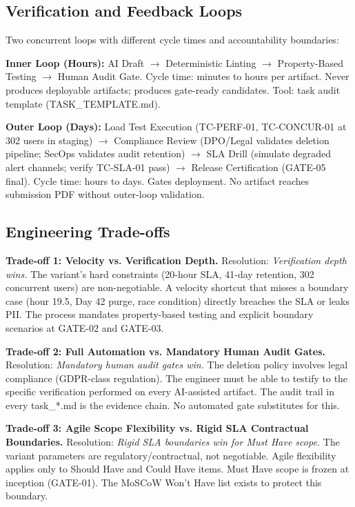 \documentclass[10pt,a4paper]{article}
\begin{document}
\subsection{Verification and Feedback Loops}

Two concurrent loops with different cycle times and accountability boundaries:

\textbf{Inner Loop (Hours):} AI Draft $\rightarrow$ Deterministic Linting $\rightarrow$ Property-Based Testing $\rightarrow$ Human Audit Gate. Cycle time: minutes to hours per artifact. Never produces deployable artifacts; produces gate-ready candidates. Tool: task audit template (TASK\_TEMPLATE.md).

\textbf{Outer Loop (Days):} Load Test Execution (TC-PERF-01, TC-CONCUR-01 at 302 users in staging) $\rightarrow$ Compliance Review (DPO/Legal validates deletion pipeline; SecOps validates audit retention) $\rightarrow$ SLA Drill (simulate degraded alert channels; verify TC-SLA-01 pass) $\rightarrow$ Release Certification (GATE-05 final). Cycle time: hours to days. Gates deployment. No artifact reaches submission PDF without outer-loop validation.

\subsection{Engineering Trade-offs}

\textbf{Trade-off 1: Velocity vs. Verification Depth.} Resolution: \textit{Verification depth wins.} The variant's hard constraints (20-hour SLA, 41-day retention, 302 concurrent users) are non-negotiable. A velocity shortcut that misses a boundary case (hour 19.5, Day 42 purge, race condition) directly breaches the SLA or leaks PII. The process mandates property-based testing and explicit boundary scenarios at GATE-02 and GATE-03.

\textbf{Trade-off 2: Full Automation vs. Mandatory Human Audit Gates.} Resolution: \textit{Mandatory human audit gates win.} The deletion policy involves legal compliance (GDPR-class regulation). The engineer must be able to testify to the specific verification performed on every AI-assisted artifact. The audit trail in every task\_*.md is the evidence chain. No automated gate substitutes for this.

\textbf{Trade-off 3: Agile Scope Flexibility vs. Rigid SLA Contractual Boundaries.} Resolution: \textit{Rigid SLA boundaries win for Must Have scope.} The variant parameters are regulatory/contractual, not negotiable. Agile flexibility applies only to Should Have and Could Have items. Must Have scope is frozen at inception (GATE-01). The MoSCoW Won't Have list exists to protect this boundary.
\end{document}
